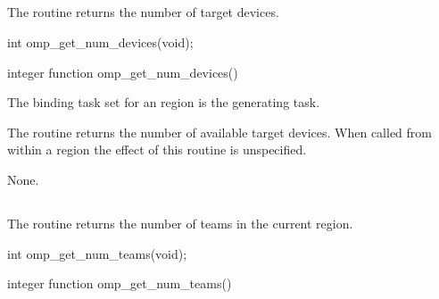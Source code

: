 \subsection{}
\label{subsec:omp_get_num_devices}
\summary
The  routine returns the number of target devices.

\format
\begin{ccppspecific}
\begin{boxedcode}
int omp\_get\_num\_devices(void);
\end{boxedcode}
\end{ccppspecific}

\begin{fortranspecific}
\begin{boxedcode}
integer function omp\_get\_num\_devices()
\end{boxedcode}
\end{fortranspecific}

\binding
The binding task set for an  region is the generating task.

\effect
The  routine returns the number of available target devices. 
When called from within a  region the effect of this routine is unspecified.

\crossreferences
None.










\subsection{}
\label{subsec:omp_get_num_teams}
\summary
The  routine returns the number of teams in the current  
region.

\pagebreak
\format
\begin{ccppspecific}
\begin{boxedcode}
int omp\_get\_num\_teams(void);
\end{boxedcode}
\end{ccppspecific}

\begin{fortranspecific}
\begin{boxedcode}
integer function omp\_get\_num\_teams()
\end{boxedcode}
\end{fortranspecific}

